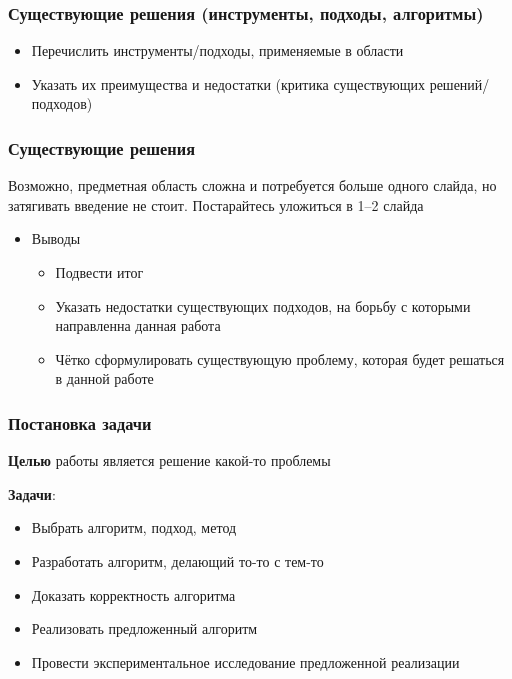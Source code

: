 \documentclass
  [ russian
  , aspectratio=1610 %
  ] {beamer}
\begin{document}
\begin{frame}
  \frametitle{Существующие решения (инструменты, подходы, алгоритмы)}
  \begin{itemize}
    \item Перечислить инструменты/подходы, применяемые в области
    \item Указать их преимущества и недостатки (критика существующих решений/подходов)
  \end{itemize}

\end{frame}

\begin{frame}
  \frametitle{Существующие решения}
  Возможно, предметная область сложна и потребуется больше одного слайда, но затягивать введение не стоит. Постарайтесь уложиться в 1--2 слайда
  \begin{itemize}
    \item Выводы
          \begin{itemize}
            \item Подвести итог
            \item Указать недостатки существующих подходов, на борьбу с которыми
                  направленна данная работа
            \item Чётко сформулировать существующую проблему, которая будет решаться в данной работе
          \end{itemize}
  \end{itemize}
\end{frame}

\begin{frame}
  \frametitle{Постановка задачи}
  \textbf{Целью} работы является решение какой-то проблемы %
  \vspace{1em}

  \textbf{Задачи}:
  \begin{itemize}
    \item Выбрать алгоритм, подход, метод %
    \item Разработать алгоритм, делающий то-то с тем-то
    \item Доказать корректность алгоритма
    \item Реализовать предложенный алгоритм
    \item Провести экспериментальное исследование предложенной реализации
  \end{itemize}
\end{frame}
\end{document}
